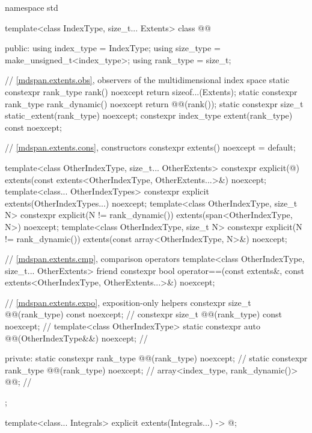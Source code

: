 \begin{codeblock}
namespace std {
  template<class IndexType, size_t... Extents>
  class @@ {
  public:
    using index_type = IndexType;
    using size_type = make_unsigned_t<index_type>;
    using rank_type = size_t;

    // \ref{mdspan.extents.obs}, observers of the multidimensional index space
    static constexpr rank_type rank() noexcept { return sizeof...(Extents); }
    static constexpr rank_type rank_dynamic() noexcept { return @@(rank()); }
    static constexpr size_t static_extent(rank_type) noexcept;
    constexpr index_type extent(rank_type) const noexcept;

    // \ref{mdspan.extents.cons}, constructors
    constexpr extents() noexcept = default;

    template<class OtherIndexType, size_t... OtherExtents>
      constexpr explicit(@\seebelow@)
        extents(const extents<OtherIndexType, OtherExtents...>&) noexcept;
    template<class... OtherIndexTypes>
      constexpr explicit extents(OtherIndexTypes...) noexcept;
    template<class OtherIndexType, size_t N>
      constexpr explicit(N != rank_dynamic())
        extents(span<OtherIndexType, N>) noexcept;
    template<class OtherIndexType, size_t N>
      constexpr explicit(N != rank_dynamic())
        extents(const array<OtherIndexType, N>&) noexcept;

    // \ref{mdspan.extents.cmp}, comparison operators
    template<class OtherIndexType, size_t... OtherExtents>
      friend constexpr bool operator==(const extents&,
                                       const extents<OtherIndexType, OtherExtents...>&) noexcept;

    // \ref{mdspan.extents.expo}, exposition-only helpers
    constexpr size_t @@(rank_type) const noexcept;     // \expos
    constexpr size_t @@(rank_type) const noexcept;     // \expos
    template<class OtherIndexType>
      static constexpr auto @@(OtherIndexType&&) noexcept;      // \expos

  private:
    static constexpr rank_type @@(rank_type) noexcept;       // \expos
    static constexpr rank_type @@(rank_type) noexcept;   // \expos
    array<index_type, rank_dynamic()> @@{};                // \expos
  };

  template<class... Integrals>
    explicit extents(Integrals...)
      -> @\seebelow@;
}
\end{codeblock}

